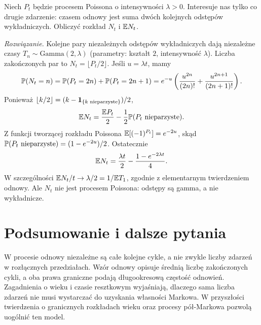 \begin{zadanie}
Niech $P_t$ będzie procesem Poissona o intensywności $\lambda>0$.
Interesuje nas tylko co drugie zdarzenie: czasem odnowy jest
suma dwóch kolejnych odstępów wykładniczych. Obliczyć
rozkład $N_t$ i $\mathbb{E} N_t$.

\emph{Rozwiązanie.} Kolejne pary niezależnych
odstępów wykładniczych dają niezależne czasy
$T_n\sim\mathrm{Gamma}(2,\lambda)$ (parametry: kształt $2$,
intensywność $\lambda$). Liczba zakończonych par to
$N_t=\lfloor P_t/2\rfloor$. Jeśli $u=\lambda t$, mamy
\[
\mathbb{P}(N_t=n)=\mathbb{P}(P_t=2n)+\mathbb{P}(P_t=2n+1)
=e^{-u}\left(\frac{u^{2n}}{(2n)!}+
\frac{u^{2n+1}}{(2n+1)!}\right).
\]
Ponieważ $\lfloor k/2\rfloor=(k-\mathbf{1}_{\{k\text{ nieparzyste}\}})/2$,
\[
\mathbb{E} N_t=\frac{\mathbb{E} P_t}{2}-\frac12\mathbb{P}(P_t\text{ nieparzyste}).
\]
Z funkcji tworzącej rozkładu Poissona
$\mathbb{E}[(-1)^{P_t}]=e^{-2u}$, skąd
$\mathbb{P}(P_t\text{ nieparzyste})=(1-e^{-2u})/2$.
Ostatecznie
\[
\mathbb{E} N_t=\frac{\lambda t}{2}-\frac{1-e^{-2\lambda t}}{4}.
\]
W szczególności $\mathbb{E} N_t/t\to\lambda/2=1/\mathbb{E} T_1$,
zgodnie z elementarnym twierdzeniem odnowy.
Ale $N_t$ nie jest procesem Poissona: odstępy są gamma,
a nie wykładnicze.
\end{zadanie}

\section{Podsumowanie i dalsze pytania}
W procesie odnowy niezależne są całe kolejne cykle, a nie
zwykle liczby zdarzeń w rozłącznych przedziałach. Wzór
odnowy opisuje średnią liczbę zakończonych cykli, a oba
prawa graniczne podają długookresową częstość odnowień.
Zagadnienia o wieku i czasie resztkowym wyjaśniają, dlaczego
sama liczba zdarzeń nie musi wystarczać do uzyskania własności Markowa.
W przyszłości twierdzenia o granicznych rozkładach wieku
oraz procesy pół-Markowa pozwolą uogólnić ten model.


